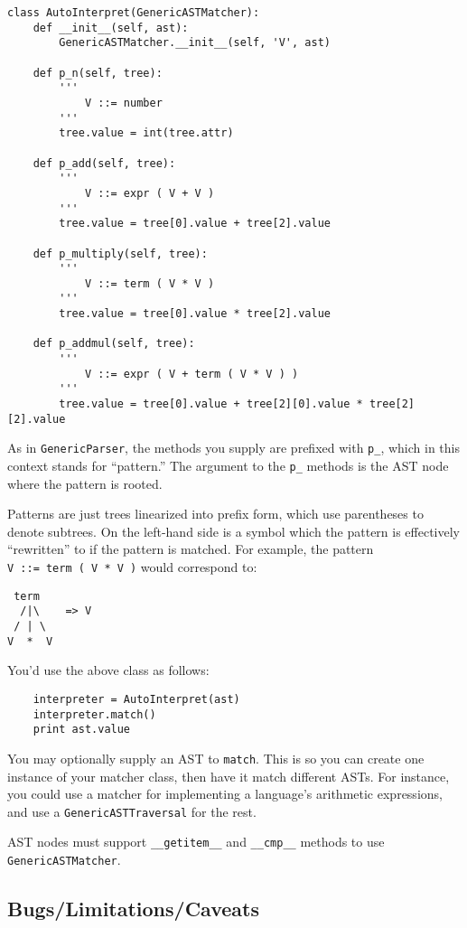 \documentclass{article}
\newcommand{\code}[1]{\texttt{#1}}
\begin{document}
\begin{verbatim}
class AutoInterpret(GenericASTMatcher):
    def __init__(self, ast):
        GenericASTMatcher.__init__(self, 'V', ast)

    def p_n(self, tree):
        '''
            V ::= number
        '''
        tree.value = int(tree.attr)

    def p_add(self, tree):
        '''
            V ::= expr ( V + V )
        '''
        tree.value = tree[0].value + tree[2].value

    def p_multiply(self, tree):
        '''
            V ::= term ( V * V )
        '''
        tree.value = tree[0].value * tree[2].value

    def p_addmul(self, tree):
        '''
            V ::= expr ( V + term ( V * V ) )
        '''
        tree.value = tree[0].value + tree[2][0].value * tree[2][2].value
\end{verbatim}

As in \code{GenericParser}, the methods you supply are prefixed with
\code{p\_}, which in this context stands for ``pattern.''  The argument
to the \code{p\_} methods is the AST node where the pattern is rooted.

Patterns are just trees linearized into prefix
form, which use parentheses to denote
subtrees.  On the left-hand side is a symbol which the pattern is
effectively ``rewritten'' to if the pattern is matched.  For example,
the pattern \code{V~::=~term~(~V~*~V~)} would correspond to:

\begin{verbatim}
 term
  /|\    => V
 / | \
V  *  V
\end{verbatim}

You'd use the above class as follows:

\begin{verbatim}
    interpreter = AutoInterpret(ast)
    interpreter.match()
    print ast.value
\end{verbatim}

You may optionally supply an AST to \code{match}.  This is so you can
create one instance of your matcher class, then have it match different
ASTs.  For instance, you could use a matcher for implementing a
language's arithmetic expressions, and use a \code{GenericASTTraversal}
for the rest.

AST nodes must support \code{\_\_getitem\_\_} and \code{\_\_cmp\_\_} methods
to use \code{GenericASTMatcher}.

\subsection{Bugs/Limitations/Caveats}
\end{document}
